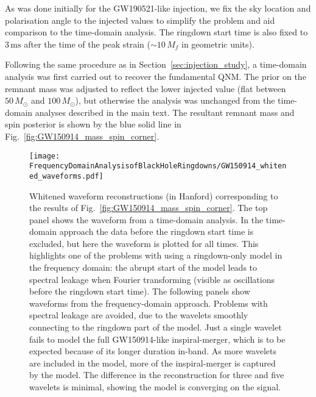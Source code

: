 As was done initially for the GW190521-like injection, we fix the sky location and polarisation angle to the injected values to simplify the problem and aid comparison to the time-domain analysis.
The ringdown start time is also fixed to $3\,\mathrm{ms}$ after the time of the peak strain ($\sim 10\,M_f$ in geometric units).

Following the same procedure as in Section~\ref{sec:injection_study}, a time-domain analysis was first carried out to recover the fundamental QNM. 
The prior on the remnant mass was adjusted to reflect the lower injected value (flat between $50\,M_\odot$ and $100\,M_\odot$), but otherwise the analysis was unchanged from the time-domain analyses described in the main text.
The resultant remnant mass and spin posterior is shown by the blue solid line in Fig.~\ref{fig:GW150914_mass_spin_corner}.

\begin{figure}[t!]
    \centering
    \texttt{[image: FrequencyDomainAnalysisofBlackHoleRingdowns/GW150914\_whitened\_waveforms.pdf]}
    \caption[Whitened waveform reconstructions (in Hanford) corresponding to the results of Fig.~\ref{fig:GW150914_mass_spin_corner}]{ 
    Whitened waveform reconstructions (in Hanford) corresponding to the results of Fig.~\ref{fig:GW150914_mass_spin_corner}. 
    The top panel shows the waveform from a time-domain analysis. 
    In the time-domain approach the data before the ringdown start time is excluded, but here the waveform is plotted for all times.
    This highlights one of the problems with using a ringdown-only model in the frequency domain: the abrupt start of the model leads to spectral leakage when Fourier transforming (visible as oscillations before the ringdown start time).
    The following panels show waveforms from the frequency-domain approach.
    Problems with spectral leakage are avoided, due to the wavelets smoothly connecting to the ringdown part of the model.
    Just a single wavelet fails to model the full GW150914-like inspiral-merger, which is to be expected because of its longer duration in-band.
    As more wavelets are included in the model, more of the inspiral-merger is captured by the model.
    The difference in the reconstruction for three and five wavelets is minimal, showing the model is converging on the signal.
    }
    \label{fig:GW150914_whitened_waveforms}
\end{figure}

